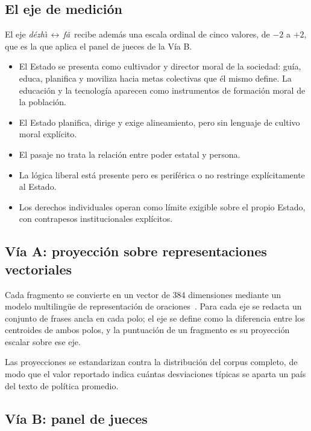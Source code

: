 \documentclass[12pt,letterpaper]{article}
\newcommand{\dezhi}{\textit{d\'ezh\`{\i}}}
\newcommand{\fa}{\textit{f\v{a}}}
\newcommand{\ejedf}{\dezhi\,$\leftrightarrow$\,\fa}
\begin{document}
\subsection{El eje de medición}

El eje \ejedf\ recibe además una escala ordinal de cinco valores, de $-2$ a $+2$, que es la que aplica el panel de jueces de la Vía B.

\begin{itemize}[leftmargin=1.2cm]
  \item[$+2$] El Estado se presenta como cultivador y director moral de la sociedad: guía, educa, planifica y moviliza hacia metas colectivas que él mismo define. La educación y la tecnología aparecen como instrumentos de formación moral de la población.
  \item[$+1$] El Estado planifica, dirige y exige alineamiento, pero sin lenguaje de cultivo moral explícito.
  \item[$\phantom{+}0$] El pasaje no trata la relación entre poder estatal y persona.
  \item[$-1$] La lógica liberal está presente pero es periférica o no restringe explícitamente al Estado.
  \item[$-2$] Los derechos individuales operan como límite exigible sobre el propio Estado, con contrapesos institucionales explícitos.
\end{itemize}

\subsection{Vía A: proyección sobre representaciones vectoriales}

Cada fragmento se convierte en un vector de 384 dimensiones mediante un modelo multilingüe de representación de oraciones~\citep{reimers2019sentencebert}. Para cada eje se redacta un conjunto de frases ancla en cada polo; el eje se define como la diferencia entre los centroides de ambos polos, y la puntuación de un fragmento es su proyección escalar sobre ese eje.

Las proyecciones se estandarizan contra la distribución del corpus completo, de modo que el valor reportado indica cuántas desviaciones típicas se aparta un país del texto de política promedio.

\subsection{Vía B: panel de jueces}
\end{document}
